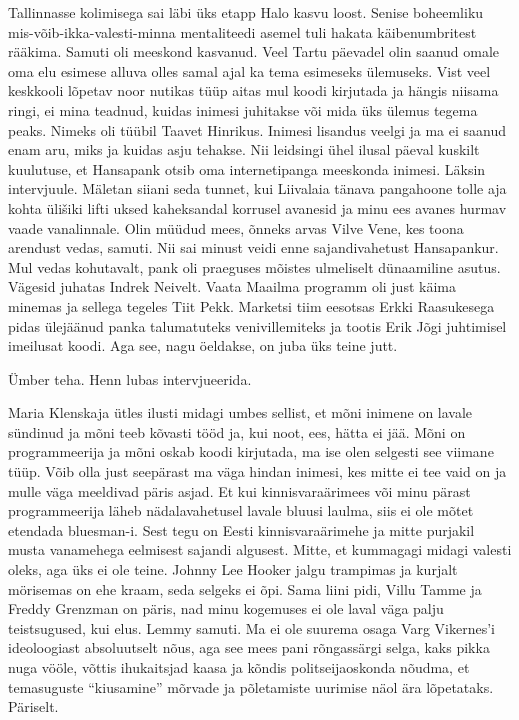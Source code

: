 Tallinnasse kolimisega sai läbi üks etapp Halo kasvu loost. Senise boheemliku 
mis-võib-ikka-valesti-minna mentaliteedi asemel tuli hakata käibenumbritest 
rääkima. Samuti oli meeskond kasvanud. Veel Tartu päevadel olin saanud omale 
oma elu esimese alluva olles samal ajal ka tema esimeseks ülemuseks. Vist veel 
keskkooli lõpetav noor nutikas tüüp aitas mul koodi kirjutada ja hängis niisama 
ringi, ei mina teadnud, kuidas inimesi juhitakse või mida üks ülemus tegema 
peaks. Nimeks oli tüübil Taavet Hinrikus. Inimesi 
lisandus veelgi ja ma ei saanud enam aru, miks ja kuidas asju tehakse. Nii 
leidsingi ühel ilusal päeval kuskilt kuulutuse, et Hansapank 
otsib oma internetipanga meeskonda inimesi. Läksin intervjuule. Mäletan siiani 
seda tunnet, kui Liivalaia tänava pangahoone tolle aja kohta ülišiki lifti 
uksed kaheksandal korrusel avanesid ja minu ees avanes hurmav vaade 
vanalinnale. Olin müüdud mees, õnneks arvas Vilve Vene, 
kes toona arendust vedas, samuti. Nii sai minust veidi enne sajandivahetust 
Hansapankur. Mul vedas kohutavalt, pank oli praeguses mõistes ulmeliselt 
dünaamiline asutus. Vägesid juhatas Indrek Neivelt. 
Vaata Maailma programm oli just käima minemas ja sellega tegeles Tiit 
Pekk. Marketsi tiim eesotsas Erkki 
Raasukesega pidas ülejäänud panka talumatuteks 
venivillemiteks ja tootis Erik Jõgi juhtimisel imeilusat 
koodi. Aga see, nagu öeldakse, on juba üks teine jutt.

Ümber teha. Henn lubas intervjueerida. 

Maria Klenskaja ütles ilusti midagi umbes sellist, et mõni inimene on lavale sündinud
ja mõni teeb kõvasti tööd ja, kui noot, ees, hätta ei jää. Mõni on programmeerija ja 
mõni oskab koodi kirjutada, ma ise olen selgesti see viimane tüüp. Võib olla just 
seepärast ma väga hindan inimesi, kes mitte ei tee vaid on ja mulle väga meeldivad päris asjad.
Et kui kinnisvaraärimees või minu pärast programmeerija
läheb nädalavahetusel lavale bluusi laulma, siis ei ole mõtet etendada bluesman-i. 
Sest tegu on Eesti kinnisvaraärimehe ja mitte  purjakil musta vanamehega eelmisest sajandi algusest. 
Mitte, et kummagagi midagi valesti oleks, aga üks ei ole teine. Johnny Lee Hooker jalgu 
trampimas ja kurjalt mörisemas on ehe kraam, seda selgeks ei õpi.
Sama liini pidi, Villu Tamme ja Freddy Grenzman on päris, nad minu kogemuses ei ole laval 
väga palju teistsugused, kui elus. Lemmy samuti. Ma ei ole suurema osaga Varg Vikernes'i ideoloogiast
absoluutselt nõus, aga see mees pani rõngassärgi selga, kaks pikka nuga vööle, võttis 
ihukaitsjad kaasa ja kõndis politseijaoskonda nõudma, et temasuguste 
\enquote{kiusamine} mõrvade ja põletamiste uurimise näol ära lõpetataks. Päriselt. 
